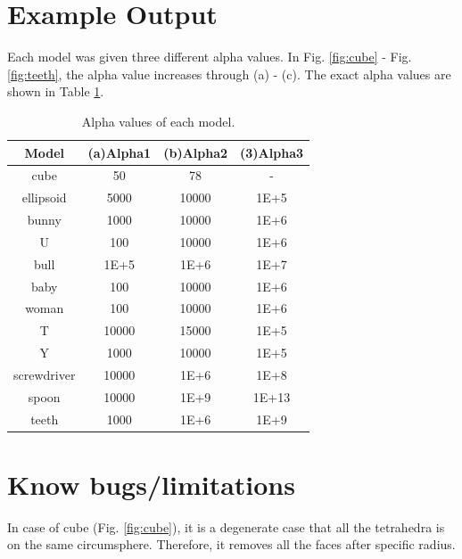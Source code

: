 \documentclass[11pt]{article}
\begin{document}
\section{Example Output}
 Each model was given three different alpha values. In Fig. \ref{fig:cube} - Fig. \ref{fig:teeth}, the alpha value increases through (a) - (c). The exact alpha values are shown in Table \ref{table:alphavalues}.
 \begin{table}[htb]
 \caption{Alpha values of each model.}
 \begin{center}
 \begin{tabular}{|c|c|c|c|}
 \hline
 Model & (a)Alpha1 & (b)Alpha2 & (3)Alpha3 \\
 \hline
 cube & 50 & 78 & - \\
 \hline
 ellipsoid & 5000 & 10000 & 1E+5 \\
 \hline
 bunny & 1000 & 10000 & 1E+6 \\
 \hline
 U & 100 & 10000 & 1E+6 \\
 \hline
 bull & 1E+5 & 1E+6 & 1E+7 \\
 \hline
 baby & 100 & 10000 & 1E+6 \\
 \hline
 woman & 100 & 10000 & 1E+6 \\
 \hline
 T & 10000 & 15000 & 1E+5 \\
 \hline
 Y & 1000 & 10000 & 1E+5 \\
 \hline
 screwdriver & 10000 & 1E+6 & 1E+8 \\
 \hline
 spoon & 10000 & 1E+9 & 1E+13 \\
 \hline
 teeth & 1000 & 1E+6 & 1E+9 \\
 \hline
 \end{tabular}
 \end{center}
 \label{table:alphavalues}
 \end{table} 
\section{Know bugs/limitations}
 In case of cube (Fig. \ref{fig:cube}), it is a degenerate case that all the tetrahedra is on the same circumsphere. Therefore, it removes all the faces after specific radius. 
 


\end{document}

